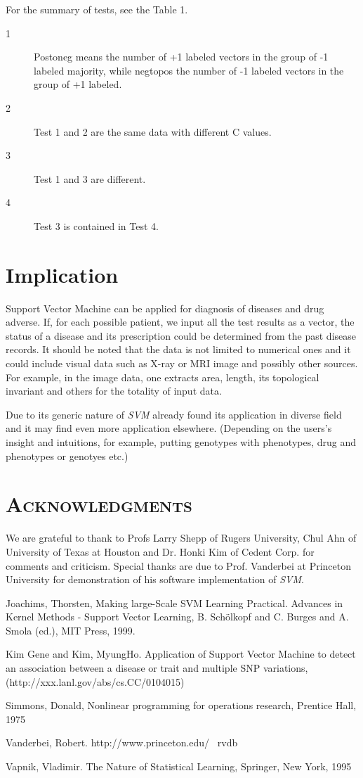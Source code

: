 \documentclass{amsart}%
\theoremstyle{plain}
\numberwithin{equation}{section}
\begin{document}
For the summary of tests, see the Table 1.

\begin{description}
\item[1] Postoneg means the number of +1 labeled vectors in the group of -1 labeled majority, while negtopos the number of -1 labeled vectors in the group of +1 labeled.

\item[2] Test 1 and 2 are the same data with different C values.
\item[3] Test 1 and 3 are different.
\item[4] Test 3 is contained in Test 4. 
\end{description}
\section{Implication}

Support Vector Machine can be applied for diagnosis of diseases and drug adverse. If, for each possible patient, we input all the test results as a vector, the status of a disease and its prescription could be determined from the past disease records. It should be
noted that the data is not limited to numerical ones and it could include
visual data such as X-ray or MRI image and possibly other sources. For example, in the image data, one extracts area, length, its topological invariant and
others for the totality of input data.

Due to its generic nature of \emph{SVM} already found its application in
diverse field and it may find even more application elsewhere. (Depending on
the users's insight and intuitions, for example, putting genotypes with phenotypes, drug and phenotypes or genotyes etc.)

\section{\textsc{Acknowledgments}}

We are grateful to thank to Profs Larry Shepp of Rugers University, Chul Ahn
of University of Texas at Houston and Dr. Honki Kim of Cedent Corp.
for comments and criticism. Special thanks are due to Prof. Vanderbei at
Princeton University for demonstration of his software implementation of 
\emph{SVM}.

\begin{thebibliography}{1}
  Joachims, Thorsten, Making large-Scale SVM Learning
Practical. Advances in Kernel Methods - Support Vector Learning, B.
Sch\"{o}lkopf and C. Burges and A. Smola (ed.), MIT Press, 1999.

  Kim Gene and Kim, MyungHo. Application of Support Vector
Machine to detect an association between a disease or trait and multiple SNP
variations, (http://xxx.lanl.gov/abs/cs.CC/0104015)

  Simmons, Donald, Nonlinear programming for operations
research, Prentice Hall, 1975

  Vanderbei, Robert. http://www.princeton.edu/~ rvdb

  Vapnik, Vladimir. The Nature of Statistical Learning,
Springer, New York, 1995
\end{thebibliography}
\end{document}
